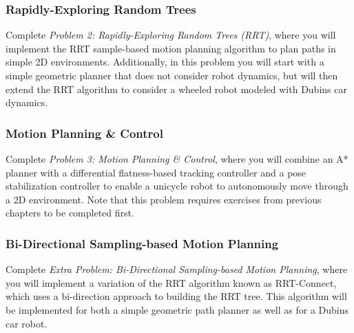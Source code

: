 \subsubsection{Rapidly-Exploring Random Trees}
Complete \textit{Problem 2: Rapidly-Exploring Random Trees (RRT)}, where you will implement the RRT sample-based motion planning algorithm to plan paths in simple 2D environments. Additionally, in this problem you will start with a simple geometric planner that does not consider robot dynamics, but will then extend the RRT algorithm to consider a wheeled robot modeled with Dubins car dynamics. 

\subsubsection{Motion Planning \& Control}
Complete \textit{Problem 3: Motion Planning \& Control}, where you will combine an A* planner with a differential flatness-based tracking controller and a pose stabilization controller to enable a unicycle robot to autonomously move through a 2D environment. Note that this problem requires exercises from previous chapters to be completed first.

\subsubsection{Bi-Directional Sampling-based Motion Planning}
Complete \textit{Extra Problem: Bi-Directional Sampling-based Motion Planning}, where you will implement a variation of the RRT algorithm known as RRT-Connect, which uses a bi-direction approach to building the RRT tree. This algorithm will be implemented for both a simple geometric path planner as well as for a Dubins car robot.